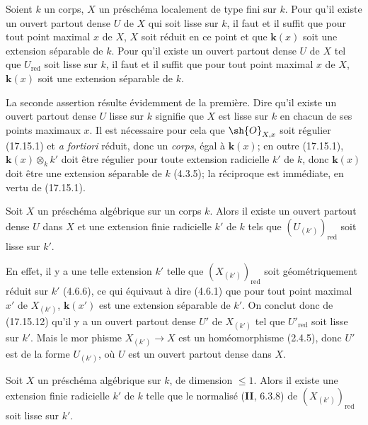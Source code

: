 \begin{proposition}[17.15.12]
\label{IV.17.15.12}
Soient $k$ un corps, $X$ un préschéma localement de type fini sur $k$. Pour qu'il existe un ouvert partout dense $U$ de $X$ qui soit lisse sur $k$, il faut et il suffit que pour tout point maximal $x$ de $X$, $X$ soit réduit en ce point et que $\boldsymbol{k}(x)$ soit une extension séparable de $k$. Pour qu'il existe un ouvert partout dense $U$ de $X$ tel que $U_{\mathrm{red}}$ soit lisse sur $k$, il faut et il suffit que pour tout point maximal $x$ de $X$, $\boldsymbol{k}(x)$ soit une extension séparable de $k$.
\end{proposition}

La seconde assertion résulte évidemment de la première. Dire qu'il existe un ouvert partout dense $U$ lisse sur $k$ signifie que $X$ est lisse sur $k$ en chacun de ses points maximaux $x$. Il est nécessaire pour cela que $\sh{O}_{X,x}$ soit régulier (17.15.1) et \emph{a fortiori} réduit, donc un \emph{corps}, égal à $\boldsymbol{k}(x)$; en outre (17.15.1), $\boldsymbol{k}(x)\otimes_k k'$ doit être régulier pour toute extension radicielle $k'$ de $k$, donc $\boldsymbol{k}(x)$ doit être une extension séparable de $k$ (4.3.5); la réciproque est immédiate, en vertu de (17.15.1).

\begin{corollary}[17.15.13]
\label{IV.17.15.13}
Soit $X$ un préschéma algébrique sur un corps $k$. Alors il existe un ouvert partout dense $U$ dans $X$ et une extension finie radicielle $k'$ de $k$ tels que $(U_{(k')})_{\mathrm{red}}$ soit lisse sur $k'$.
\end{corollary}

En effet, il y a une telle extension $k'$ telle que $(X_{(k')})_{\mathrm{red}}$ soit géométriquement réduit sur $k'$ (4.6.6), ce qui équivaut à dire (4.6.1) que pour tout point maximal $x'$ de $X_{(k')}$, $\boldsymbol{k}(x')$ est une extension séparable de $k'$. On conclut donc de (17.15.12) qu'il y a un ouvert partout dense $U'$ de $X_{(k')}$ tel que $U'_{\mathrm{red}}$ soit lisse sur $k'$. Mais le mor%
phisme $X_{(k')}\to X$ est un homéomorphisme (2.4.5), donc $U'$ est de la forme $U_{(k')}$, où $U$ est un ouvert partout dense dans $X$.

\begin{proposition}[17.15.14]
\label{IV.17.15.14}
Soit $X$ un préschéma algébrique sur $k$, de dimension $\leq1$. Alors il existe une extension finie radicielle $k'$ de $k$ telle que le normalisé \textup{(\textbf{II}, 6.3.8)} de $(X_{(k')})_{\mathrm{red}}$ soit lisse sur $k'$.
\end{proposition}

